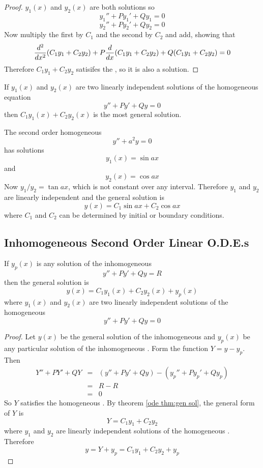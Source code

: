 \begin{proof}
$y_1(x)$ and $y_2(x)$ are both solutions so
$$y_1''+Py_1'+Qy_1=0$$
$$y_2''+Py_2'+Qy_2=0$$
Now multiply the first by $C_1$ and the second by $C_2$
and add, showing that
$$\frac{d^{2}}{d{x}^{2}}(C_1y_1+C_2y_2)+P\frac{d}{d{x}}(C_1y_1+C_2y_2)+Q(C_1y_1+C_2y_2)=0$$
Therefore $C_1y_1+C_2y_2$ satisifes the \ODE, so it is also a solution.
\end{proof}

\begin{theorem}
\label{ode thm:gen sol}
If $y_1(x)$ and $y_2(x)$ are two linearly independent solutions of the 
homogeneous equation
$$y''+Py'+Qy=0$$
then $C_1y_1(x)+C_2y_2(x)$ is the most general solution.
\end{theorem}

\begin{example}
The second order homogeneous \ODE
$$y''+a^2y=0$$
has solutions
$$y_1(x)=\sin ax$$
and
$$y_2(x)=\cos ax$$
Now $y_1/y_2=\tan ax$, which is not constant over any interval. 
Therefore $y_1$ and $y_2$ are linearly independent and the general solution
is
$$y(x)=C_1\sin ax + C_2\cos ax$$
where $C_1$ and $C_2$ can be determined by initial or boundary conditions.
\end{example}

\subsection{Inhomogeneous Second Order Linear O.D.E.s}

\begin{theorem}
If $y_p(x)$ is any solution of the inhomogeneous \ODE
$$y''+Py'+Qy=R$$
then the general solution is
$$y(x)=C_1y_1(x)+C_2y_2(x)+y_p(x)$$
where $y_1(x)$ and $y_2(x)$ are two linearly independent solutions of the 
homogeneous \ODE
$$y''+Py'+Qy=0$$
\end{theorem}

\begin{proof}
Let $y(x)$ be the general solution of the inhomogeneous \ODE and $y_p(x)$
be any particular solution of the inhomogeneous \ODE.  Form the function
$Y=y-y_p$.  Then
\begin{eqnarray*}
Y''+PY'+QY&=&(y''+Py'+Qy)-(y_p''+Py_p'+Qy_p) \\
&=&R-R\\
&=&0
\end{eqnarray*}
So $Y$ satisfies the homogeneous \ODE.  By theorem \ref{ode thm:gen sol}, 
the general form of $Y$ is
$$Y=C_1y_1+C_2y_2$$
where $y_1$ and $y_2$ are linearly independent solutions of the homogeneous
\ODE.  Therefore
$$y=Y+y_p=C_1y_1+C_2y_2+y_p$$
\end{proof}

